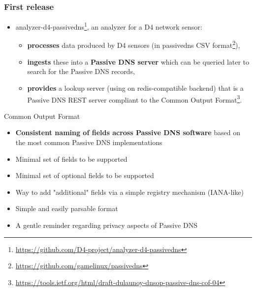 \documentclass{beamer}
\begin{document}
\begin{frame}
        \frametitle{First release}

 \begin{itemize}
         \item[\checkmark]
           analyzer-d4-passivedns\footnote{\url{https://github.com/D4-project/analyzer-d4-passivedns}}, an analyzer for a D4 network sensor:

           \begin{itemize}
           \item {\bf processes} data produced by D4 sensors (in passivedns CSV format\footnote{\url{https://github.com/gamelinux/passivedns}}),
           
         \item{\bf ingests} these into a {\bf Passive DNS server} which can be queried later to search for the Passive DNS records,

         \item{\bf provides} a lookup server (using on
           redis-compatible backend) that is a Passive DNS REST server compliant to the Common Output Format\footnote{\url{https://tools.ietf.org/html/draft-dulaunoy-dnsop-passive-dns-cof-04}}.
         \end{itemize}
\end{itemize}
\end{frame}



\begin{frame}[t]{Common Output Format}
\begin{itemize}
\item {\bf Consistent naming of fields across Passive DNS software} based on the most common Passive DNS implementations
\item Minimal set of fields to be supported
\item Minimal set of optional fields to be supported
\item Way to add "additional" fields via a simple registry mechanism (IANA-like)
\item Simple and easily parsable format
\item A gentle reminder regarding privacy aspects of Passive DNS
\end{itemize}
\end{frame}
\end{document}
